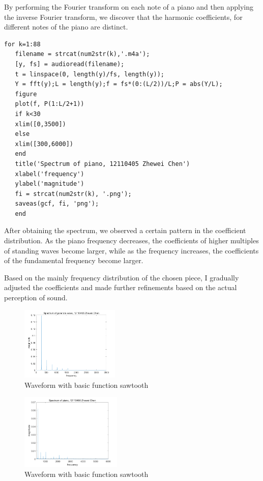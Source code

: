 \documentclass[journal]{IEEEtran}
\begin{document}
By performing the Fourier transform on each note of a piano and then applying the inverse Fourier transform, we discover that the harmonic coefficients, for different notes of the piano are distinct.
\begin{lstlisting}[style=Matlab-editor]
   for k=1:88
   filename = strcat(num2str(k),'.m4a'); 
   [y, fs] = audioread(filename);
   t = linspace(0, length(y)/fs, length(y));
   Y = fft(y);L = length(y);f = fs*(0:(L/2))/L;P = abs(Y/L);
   figure
   plot(f, P(1:L/2+1))
   if k<30
   xlim([0,3500])
   else
   xlim([300,6000])
   end
   title('Spectrum of piano, 12110405 Zhewei Chen')
   xlabel('frequency')
   ylabel('magnitude')
   fi = strcat(num2str(k), '.png');
   saveas(gcf, fi, 'png');
   end
\end{lstlisting}

After obtaining the spectrum, we observed a certain pattern in the coefficient distribution. As the piano frequency decreases, the coefficients of higher multiples of standing waves become larger, while as the frequency increases, the coefficients of the fundamental frequency become larger.

Based on the mainly frequency distribution of the chosen piece, I gradually adjusted the coefficients and made further refinements based on the actual perception of sound.

\begin{figure}[htbp]
   \centering
   \includegraphics[width=0.42\textwidth]{m.png} 
   \caption{Waveform with basic function sawtooth}
   \label{fig:4}
\end{figure}
\begin{figure}[htbp]
   \centering
   \includegraphics[width=0.43\textwidth]{36.png} 
   \caption{Waveform with basic function sawtooth}
   \label{fig:4}
\end{figure}
\end{document}
